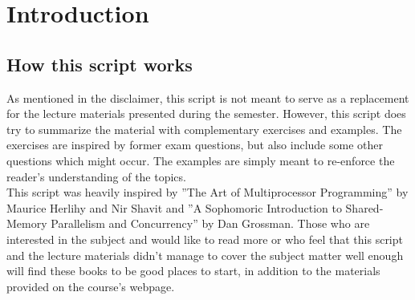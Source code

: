 \documentclass[main]{subfiles}
\begin{document}
\section{Introduction}
\subsection{How this script works}
As mentioned in the disclaimer, this script is not meant to serve as a replacement for the lecture materials presented during the semester. However, this script does try to summarize the material with complementary exercises and examples. The exercises are inspired by former exam questions, but also include some other questions which might occur. The examples are simply meant to re-enforce the reader's understanding of the topics.\\[3mm]
This script was heavily inspired by ''The Art of Multiprocessor Programming'' by Maurice Herlihy and Nir Shavit and ''A Sophomoric Introduction to Shared-Memory Parallelism and Concurrency'' by Dan Grossman. Those who are interested in the subject and would like to read more or who feel that this script and the lecture materials didn't manage to cover the subject matter well enough will find these books to be good places to start, in addition to the materials provided on the course's webpage.
\end{document}
